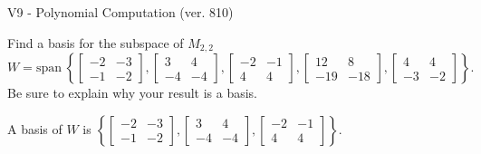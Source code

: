 \begin{exercise}
  \begin{exerciseTitle}V9 - Polynomial Computation (ver. 810)\end{exerciseTitle}
  \begin{exerciseStatement}
    Find a basis for the subspace of \(M_{2,2}\) 
\[W=\mathrm{span}\ \left\{\left[\begin{array}{cc}
-2 & -3 \\
-1 & -2
\end{array}\right] , \left[\begin{array}{cc}
3 & 4 \\
-4 & -4
\end{array}\right] , \left[\begin{array}{cc}
-2 & -1 \\
4 & 4
\end{array}\right] , \left[\begin{array}{cc}
12 & 8 \\
-19 & -18
\end{array}\right] , \left[\begin{array}{cc}
4 & 4 \\
-3 & -2
\end{array}\right]\right\}.\]
 Be sure to explain why your result is a basis.


  \end{exerciseStatement}
  \begin{exerciseAnswer}
   A basis of \(W\) is  \(\left\{\left[\begin{array}{cc}
-2 & -3 \\
-1 & -2
\end{array}\right] , \left[\begin{array}{cc}
3 & 4 \\
-4 & -4
\end{array}\right] , \left[\begin{array}{cc}
-2 & -1 \\
4 & 4
\end{array}\right]\right\}\).
  


  \end{exerciseAnswer}
\end{exercise}